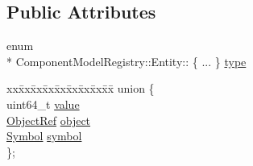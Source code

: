 \subsection*{Public Attributes}
\begin{DoxyCompactItemize}
\item 
enum \\*
Component\+Model\+Registry\+::\+Entity\+:: \{ ... \}  \hyperlink{struct_component_model_registry_1_1_entity_abc7ff8f8813d0241421ade34865d1757}{type}
\item 
\begin{tabbing}
xx\=xx\=xx\=xx\=xx\=xx\=xx\=xx\=xx\=\kill
union \{\\
\>uint64\_t \hyperlink{struct_component_model_registry_1_1_entity_a917268223412c13b12e6fe376af90f8e}{value}\\
\>\hyperlink{class_component_model_registry_a315c966cec3143524c002daa7301b054}{ObjectRef} \hyperlink{struct_component_model_registry_1_1_entity_a3ec24673c1e35e8b3554c7e170861d23}{object}\\
\>\hyperlink{class_component_model_registry_a76ae77a9f2c8f03598f7c45e3450cc49}{Symbol} \hyperlink{struct_component_model_registry_1_1_entity_afd1e3662c71124bf3fd19947fa5d1349}{symbol}\\
\}; \\

\end{tabbing}\end{DoxyCompactItemize}


